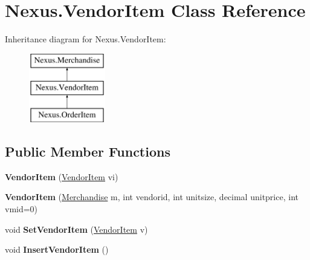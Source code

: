 \hypertarget{class_nexus_1_1_vendor_item}{}\section{Nexus.\+Vendor\+Item Class Reference}
\label{class_nexus_1_1_vendor_item}
Inheritance diagram for Nexus.\+Vendor\+Item\+:\begin{figure}[H]
\begin{center}
\leavevmode
\includegraphics[height=3.000000cm]{class_nexus_1_1_vendor_item}
\end{center}
\end{figure}
\subsection*{Public Member Functions}
\begin{DoxyCompactItemize}
\item 
\mbox{\label{class_nexus_1_1_vendor_item_a84aaeaf630e55fbe1ccbf1722a58b02e}} 
{\bfseries Vendor\+Item} (\mbox{\hyperlink{class_nexus_1_1_vendor_item}{Vendor\+Item}} vi)
\item 
\mbox{\label{class_nexus_1_1_vendor_item_a9f6e8812d7fc4a1f6f32bed9baac8d00}} 
{\bfseries Vendor\+Item} (\mbox{\hyperlink{class_nexus_1_1_merchandise}{Merchandise}} m, int vendorid, int unitsize, decimal unitprice, int vmid=0)
\item 
\mbox{\label{class_nexus_1_1_vendor_item_a270c8e24390dbfcca9227567c980a5f5}} 
void {\bfseries Set\+Vendor\+Item} (\mbox{\hyperlink{class_nexus_1_1_vendor_item}{Vendor\+Item}} v)
\item 
\mbox{\label{class_nexus_1_1_vendor_item_a1ec5213a50c639e3f50f111df923539e}} 
void {\bfseries Insert\+Vendor\+Item} ()
\end{DoxyCompactItemize}
